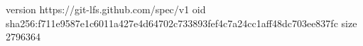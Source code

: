 version https://git-lfs.github.com/spec/v1
oid sha256:f711e9587e1c6011a427e4d64702c733893fef4c7a24cc1aff48dc703ee837fc
size 2796364
